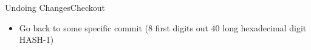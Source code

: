 \begin{frame}{Undoing Changes}{Checkout}
\begin{itemize}
\item Go back to some specific commit
 (8 first digits out 40 long hexadecimal digit HASH-1)
\end{itemize}
\end{frame}
